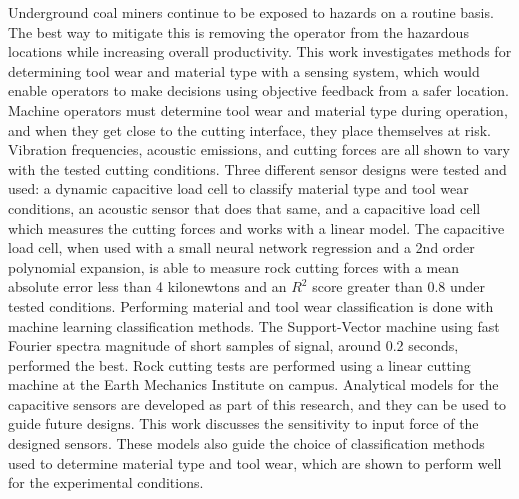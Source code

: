 Underground coal miners continue to be exposed to hazards on a routine basis.
The best way to mitigate this is removing the operator from the hazardous locations
while increasing overall productivity.
This work investigates methods for determining tool wear and material type
with a sensing system, which would enable operators to make decisions using objective feedback
from a safer location.
Machine operators must determine tool wear and material type during operation,
and when they get close to the cutting interface, they place themselves at risk.
Vibration frequencies, acoustic emissions, and cutting forces are all shown to 
vary with the tested cutting conditions.
Three different sensor designs were tested and used: 
a dynamic capacitive load cell to classify material type and tool wear conditions,
an acoustic sensor that does that same,
and a capacitive load cell which measures the cutting forces and works with a linear model.
The capacitive load cell, when used with a small neural network regression and a 2nd order polynomial
expansion, is able to measure rock cutting forces with a mean absolute error less than 4 kilonewtons
and an $R^2$ score greater than 0.8 under tested conditions.
Performing material and tool wear classification is done
with machine learning classification methods.
The Support-Vector machine using fast Fourier spectra magnitude 
of short samples of signal, around 0.2 seconds, performed the best.
Rock cutting tests are performed using a linear cutting machine at the Earth Mechanics Institute on campus.
Analytical models for the capacitive sensors are developed as part of this research, and 
they can be used to guide future designs. 
This work discusses the sensitivity to input force of the designed sensors.
These models also guide the choice of classification methods used to determine material type and tool wear,
which are shown to perform well for the experimental conditions.


